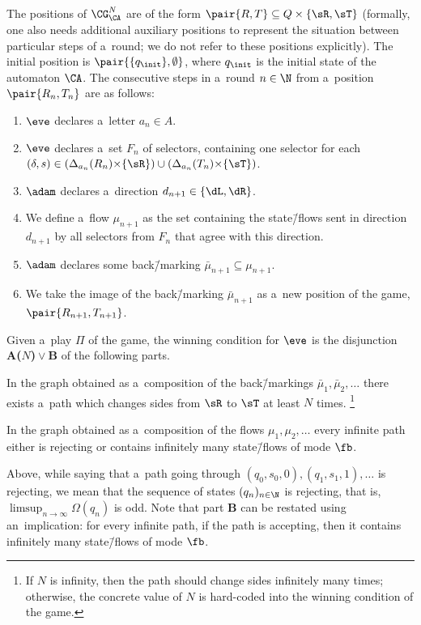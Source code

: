\documentclass{lmcs}
\numberwithin{equation}{section}
\numberwithin{figure}{section}
\newcommand{\itemfont}[1]{\textbf{#1}}
\begin{document}
The positions of $\CG^N_\CA$ are of the form $\pair{R,T}\subseteq Q\times\{\sR,\sT\}$
(formally, one also needs additional auxiliary positions to represent the situation between particular steps of a~round; we do not refer to these positions explicitly).
The initial position is $\pair{\{q_\init\}, \emptyset}$, where $q_\init$ is the initial state of the automaton $\CA$.
The consecutive steps in a~round $n\in\N$ from a~position $\pair{R_n,T_n}$ are as follows:
\begin{enumerate}
\item \label{st:G-letter}	$\eve$ declares a~letter $a_n\in A$.
\item \label{st:G-selectors}	$\eve$ declares a~set $F_n$ of selectors, containing one selector for each $(\delta,s)\in(\Delta_{a_n}(R_n){\times}\{\sR\})\cup(\Delta_{a_n}(T_n){\times}\{\sT\})$.
\item \label{st:G-direction}	$\adam$ declares a~direction $d_{n+1}\in\{\dL,\dR\}$.
\item \label{st:G-flow}	We define a~flow $\mu_{n+1}$ as the set containing the state\=/flows sent in direction $d_{n+1}$ by all selectors from $F_n$ that agree with this direction.\label{it:step-flow}
\item \label{st:G-backmarking}	$\adam$ declares some back\=/marking $\bar\mu_{n+1}\subseteq\mu_{n+1}$.
\item \label{st:G-image}	We take the image of the back\=/marking $\bar\mu_{n+1}$ as a~new position of the game, $\pair{R_{n+1},T_{n+1}}$.
\end{enumerate}
\noindent %
Given a~play $\Pi$ of the game, the winning condition for $\eve$ is the disjunction \itemfont{A($N$)}${}\lor{}$\itemfont{B} of the following parts.
\begin{description}[leftmargin=4em]
\item[A($N$)] In the graph obtained as a~composition of the back\=/markings $\bar\mu_1,\bar\mu_2,\dots$ there exists a~path which changes sides from $\sR$ to $\sT$ at least $N$ times.%
	\footnote{If $N$ is infinity, then the path should change sides infinitely many times; otherwise, the concrete value of $N$ is hard-coded into the winning condition of the game.}
\item[B] In the graph obtained as a~composition of the flows $\mu_1,\mu_2,\dots$ every infinite path either is rejecting or contains infinitely many state\=/flows of mode $\fb$.
\end{description}
\noindent %
Above, while saying that a~path going through $(q_0,s_0,0),(q_1,s_1,1),\dots$ is rejecting, we mean that the sequence of states $(q_n)_{n\in\N}$ is rejecting, that is, $\limsup_{n\to\infty}\Omega(q_n)$ is odd.
Note that part \itemfont{B} can be restated using an~implication: for every infinite path, if the path is accepting, then it contains infinitely many state\=/flows of mode $\fb$.
\end{document}
